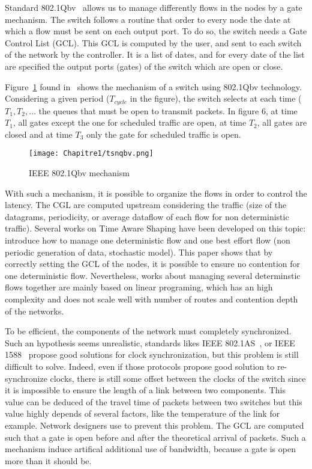 Standard 802.1Qbv~\cite{8613095} allows us to manage differently flows in the nodes by a gate mechanism. The switch follows a routine that order to every node the date at which a flow must be sent on each output port. To do so, the switch needs a Gate Control List (GCL). This GCL is computed by the user, and sent to each switch of the network by the controller. It is a list of dates, and for every date of the list are specified the output ports (gates) of the switch which are open or close.


Figure~\ref{fig:tsnqbv} found in~\cite{durr2016no} shows the mechanism of a switch using 802.1Qbv technology. Considering a given period ($T_{cycle}$ in the figure), the switch selects at each time ($T_1 , T_2 , \ldots$ the queues that must be open to transmit packets. In figure 6, at time $T_1$, all gates except the one for scheduled traffic are open, at time $T_2$, all gates are closed and at time $T_3$ only the gate for scheduled traffic is open.

  \begin{figure}
  \begin{center}
  \texttt{[image: Chapitre1/tsnqbv.png]}
  \end{center}
  \caption{IEEE 802.1Qbv mechanism}\label{fig:tsnqbv}
  \end{figure}
      
With such a mechanism, it is possible to organize the flows in order to control the latency. The CGL are computed upstream considering the traffic (size of the datagrams, periodicity, or average dataflow of each flow for non deterministic traffic). Several works on Time Aware Shaping have been developed on this topic: \cite{al2017modeling} introduce how to manage one deterministic flow and one best effort flow (non periodic generation of data, stochastic model). This paper shows that by correctly setting the GCL of the nodes, it is possible to ensure no contention for one deterministic flow. Nevertheless, works about managing several determinstic flows together are mainly based on linear programing, which has an high complexity and does not scale well with number of routes and contention depth of the networks. 

To be efficient, the components of the network must completely synchronized. Such an hypothesis seems unrealistic, standards likes IEEE 802.1AS~\cite{5741898}, or IEEE 1588~\cite{4579760} propose good solutions for clock synchronization, but this problem is still difficult to solve. Indeed, even if those protocols propose good solution to re-synchronize clocks, there is still some offset between the clocks of the switch since it is impossible to ensure the length of a link between two components. This value can be deduced of the travel time of packets between two switches but this value highly depends of several factors, like the temperature of the link for example. Network designers use  to prevent this problem. The GCL are computed such that a gate is open before and after the theoretical arrival of packets. Such a mechanism induce artifical additional use of bandwidth, because a gate is open more than it should be.

